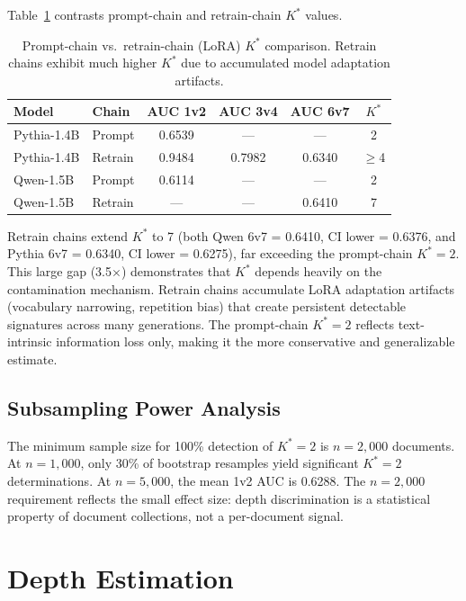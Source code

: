 \documentclass[11pt]{article}
\newcommand{\kstar}{K^*}
\begin{document}
Table~\ref{tab:retrain} contrasts prompt-chain and retrain-chain $\kstar$ values.

\begin{table}[t]
\centering
\caption{Prompt-chain vs.\ retrain-chain (LoRA) $\kstar$ comparison. Retrain chains exhibit much higher $\kstar$ due to accumulated model adaptation artifacts.}
\label{tab:retrain}
\small
\begin{tabular}{llcccc}
\toprule
Model & Chain & AUC 1v2 & AUC 3v4 & AUC 6v7 & $\kstar$ \\
\midrule
Pythia-1.4B & Prompt & 0.6539 & --- & --- & 2 \\
Pythia-1.4B & Retrain & 0.9484 & 0.7982 & 0.6340 & $\geq$4 \\
Qwen-1.5B & Prompt & 0.6114 & --- & --- & 2 \\
Qwen-1.5B & Retrain & --- & --- & 0.6410 & 7 \\
\bottomrule
\end{tabular}
\end{table}

Retrain chains extend $\kstar$ to 7 (both Qwen 6v7 = 0.6410, CI lower = 0.6376, and Pythia 6v7 = 0.6340, CI lower = 0.6275), far exceeding the prompt-chain $\kstar{=}2$. This large gap (3.5$\times$) demonstrates that $\kstar$ depends heavily on the contamination mechanism. Retrain chains accumulate LoRA adaptation artifacts (vocabulary narrowing, repetition bias) that create persistent detectable signatures across many generations. The prompt-chain $\kstar{=}2$ reflects text-intrinsic information loss only, making it the more conservative and generalizable estimate.


\subsection{Subsampling Power Analysis}

The minimum sample size for 100\% detection of $\kstar{=}2$ is $n = 2{,}000$ documents. At $n = 1{,}000$, only 30\% of bootstrap resamples yield significant $\kstar{=}2$ determinations. At $n = 5{,}000$, the mean 1v2 AUC is 0.6288. The $n = 2{,}000$ requirement reflects the small effect size: depth discrimination is a statistical property of document collections, not a per-document signal.


\section{Depth Estimation}
\label{sec:estimation}
\end{document}
